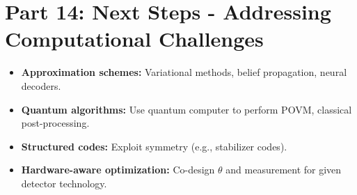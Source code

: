 \documentclass[11pt,a4paper]{article}
\begin{document}
\section{Part 14: Next Steps - Addressing Computational Challenges}

\begin{itemize}
    \item \textbf{Approximation schemes:} Variational methods, belief propagation, neural decoders.
    \item \textbf{Quantum algorithms:} Use quantum computer to perform POVM, classical post-processing.
    \item \textbf{Structured codes:} Exploit symmetry (e.g., stabilizer codes).
    \item \textbf{Hardware-aware optimization:} Co-design $\theta$ and measurement for given detector technology.
\end{itemize}
\end{document}
